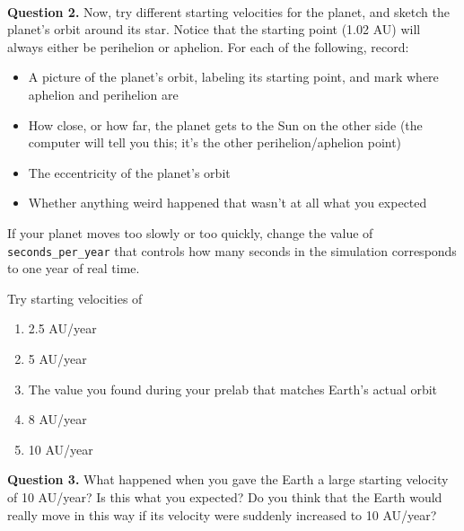 \documentclass[11pt]{article}
\begin{document}
\vspace{1.5cm}
\hrulefill\\


\textbf{Question 2.} Now, try different starting velocities for the planet, and sketch the planet's orbit around its star. Notice that the starting point (1.02 AU) will always either be perihelion or aphelion. For each of the following, record:

\begin{itemize}

\item A picture of the planet's orbit, labeling its starting point, and mark where aphelion and perihelion are

\item How close, or how far, the planet gets to the Sun on the other side (the computer will tell you this; it's the other perihelion/aphelion point)

\item The eccentricity of the planet's orbit

\item Whether anything weird happened that wasn't at all what you expected

\end{itemize}


If your planet moves too slowly or too quickly, change the value of {\tt seconds\_per\_year} that controls how many seconds in the simulation corresponds to one year of real time.


\newpage
Try starting velocities of


\begin{enumerate}
	\item 2.5 AU/year
	\vspace{1.5in}
	\item 5 AU/year
	\vspace{1.5in}
	\item The value you found during your prelab that matches Earth's actual orbit
	\vspace{1.5in}
	\item 8 AU/year
	\vspace{1.5in}
	\item 10 AU/year
	
\end{enumerate}

\newpage

\textbf{Question 3.} What happened when you gave the Earth a large starting velocity of 10 AU/year? Is this what you expected? Do you think that the Earth would really move in this way if its velocity were suddenly increased to 10 AU/year?
\end{document}
